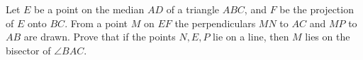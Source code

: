 Let $E$ be a point on the median $AD$ of a triangle $ABC$, and $F$ be the projection of $E$ onto $BC$. From a point $M$ on $EF$ the perpendiculars $MN$ to $AC$ and $MP$ to $AB$ are drawn. Prove that if the points $N,E,P$ lie on a line, then $M$ lies on the bisector of $\angle BAC$.